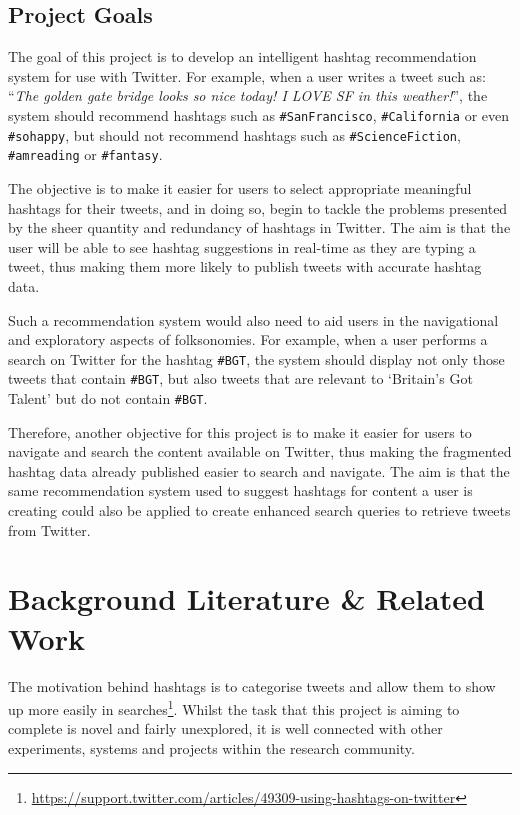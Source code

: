 \documentclass[11pt,a4paper]{report}
\begin{document}
\section{Project Goals}

The goal of this project is to develop an intelligent hashtag recommendation system for use with Twitter. For example, when a user writes a tweet such as: ``\emph{The golden gate bridge looks so nice today! I LOVE SF in this weather!}'', the system should recommend hashtags such as \texttt{\#SanFrancisco}, \texttt{\#California} or even \texttt{\#sohappy}, but should not recommend hashtags such as \texttt{\#ScienceFiction}, \texttt{\#amreading} or \texttt{\#fantasy}.

The objective is to make it easier for users to select appropriate meaningful hashtags for their tweets, and in doing so, begin to tackle the problems presented by the sheer quantity and redundancy of hashtags in Twitter. The aim is that the user will be able to see hashtag suggestions in real-time as they are typing a tweet, thus making them more likely to publish tweets with accurate hashtag data.

Such a recommendation system would also need to aid users in the navigational and exploratory aspects of folksonomies. For example, when a user performs a search on Twitter for the hashtag \texttt{\#BGT}, the system should display not only those tweets that contain \texttt{\#BGT}, but also tweets that are relevant to `Britain's Got Talent' but do not contain \texttt{\#BGT}.

Therefore, another objective for this project is to make it easier for users to navigate and search the content available on Twitter, thus making the fragmented hashtag data already published easier to search and navigate. The aim is that the same recommendation system used to suggest hashtags for content a user is creating could also be applied to create enhanced search queries to retrieve tweets from Twitter.

\pagebreak

\chapter{Background Literature \& Related Work}
\label{chap:litreview}
The motivation behind hashtags is to categorise tweets and allow them to show up more easily in searches\footnote{\url{https://support.twitter.com/articles/49309-using-hashtags-on-twitter}}. Whilst the task that this project is aiming to complete is novel and fairly unexplored, it is well connected with other experiments, systems and projects within the research community.
\end{document}
